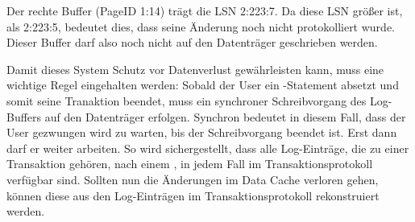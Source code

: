         Der rechte Buffer (PageID 1:14) trägt die LSN 2:223:7. Da diese LSN
        größer ist, als 2:223:5, bedeutet dies, dass seine Änderung noch nicht
        protokolliert wurde. Dieser Buffer darf also noch nicht auf den
        Datenträger geschrieben werden.
        
        Damit dieses System Schutz vor Datenverlust gewährleisten kann, muss
        eine wichtige Regel eingehalten werden: Sobald der User ein
        -Statement absetzt und somit seine Tranaktion
        beendet, muss ein synchroner Schreibvorgang des Log-Buffers auf den
        Datenträger erfolgen. Synchron bedeutet in diesem Fall, dass der User
        gezwungen wird zu warten, bis der Schreibvorgang beendet ist. Erst dann
        darf er weiter arbeiten. So wird sichergestellt, dass alle Log-Einträge,
        die zu einer Transaktion gehören, nach einem , in
        jedem Fall im Transaktionsprotokoll verfügbar sind. Sollten nun die
        Änderungen im Data Cache verloren gehen, können diese aus den
        Log-Einträgen im Transaktionsprotokoll rekonstruiert werden.
          